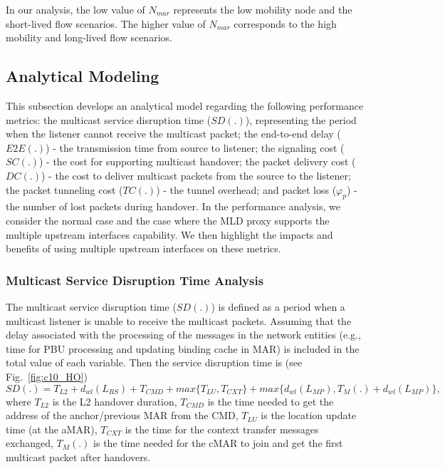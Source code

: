 In our analysis, the low value of $N_{mar}$ represents the low mobility node and the short-lived flow scenarios. The higher value of $N_{mar}$ corresponds to the high mobility and long-lived flow scenarios.   

\subsection{Analytical Modeling}
This subsection develops an analytical model regarding the following performance metrics: the multicast service disruption time ($SD(.)$), representing the period when the listener cannot receive the multicast packet; the end-to-end delay ($E2E(.)$) - the transmission time from source to listener; the signaling cost ($SC(.)$) - the cost for supporting multicast handover; the packet delivery cost ($DC(.)$) - the cost to deliver multicast packets from the source to the listener; the packet tunneling cost ($TC(.)$) - the tunnel overhead;  and packet loss ($\varphi_{p}$) - the number of lost packets during handover. In the performance analysis, we consider the normal case and the case where the MLD proxy supports the multiple upstream interfaces capability. We then highlight the impacts and benefits of using multiple upstream interfaces on these metrics. 

\subsubsection{Multicast Service Disruption Time Analysis}
The multicast service disruption time ($SD(.)$) is defined as a period when a multicast listener is unable to receive the multicast packets. 
Assuming that the delay associated with the processing of the messages in the network entities (e.g., time for PBU processing and updating binding cache in MAR) is included in the total value of each variable. Then the service disruption time is (see Fig.~\ref{fig:c10_HO}) \\
\small
\begin{equation}
SD(.) = T_{L2} + d_{wl}(L_{RS}) +T_{CMD} + max \{ T_{LU}, T_{CXT}\}  +max \{d_{wl}(L_{MP}), T_{M}{(.)} + d_{wl}(L_{MP})\},
\label{eq:sd}
\end{equation}
\normalsize
where $T_{L2}$ is the L2 handover duration, $T_{CMD}$ is the time needed to get the address of the anchor/previous MAR from the CMD, $T_{LU}$ is the location update time (at the aMAR), $T_{CXT}$ is the time for the context transfer messages exchanged, $T_{M} (.)$ is the time needed for the cMAR to join and get the first multicast packet after handovers. 

